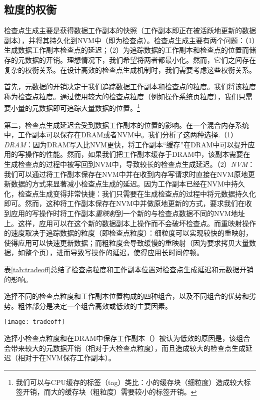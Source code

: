 \subsection{粒度的权衡}\label{subsec:granularity-tradeoff}

检查点生成主要是获得数据工作副本的快照（工作副本即正在被活跃地更新的数据副本），并将其持久化到NVM中（即为检查点）。检查点生成主要有两个问题：（1）生成数据工作副本检查点的延迟；（2）为追踪数据的工作副本和检查点的位置而储存的元数据的开销。理想情况下，我们希望将两者都最小化。然而，它们之间存在复杂的权衡关系。在设计高效的检查点生成机制时，我们需要考虑这些权衡关系。

首先，元数据的开销决定于我们追踪数据工作副本和检查点的粒度。我们将该粒度称为检查点粒度。通过使用较大的检查点粒度（例如操作系统页粒度），我们只需要小量的元数据即可追踪大量数据的位置。\footnote{我们可以与CPU缓存的标签（tag）类比：小的缓存块（细粒度）造成较大标签开销，而大的缓存块（粗粒度）需要较小的标签开销。}

第二，检查点生成延迟会受到数据工作副本的位置的影响。在一个混合内存系统中，工作副本可以保存在DRAM或者NVM中。我们分析了这两种选择.（1）{\em DRAM}：因为DRAM写入比NVM更快，将工作副本“缓存”在DRAM中可以提升应用的写操作的性能。然而，如果我们把工作副本缓存于DRAM中，该副本需要在生成检查点的过程中被写回到NVM中，导致较长的检查点生成延迟。（2）{\em NVM}：我们可以通过将工作副本保存在NVM中并在收到内存写请求时直接在NVM原地更新数据的方式来显著减小检查点生成的延迟。因为工作副本已经在NVM中持久化，检查点生成变得非常快捷：我们只需要在生成检查点的过程中将元数据持久化即可。然而，这种将工作副本保存在NVM中并做原地更新的方式，要求我们在收到应用的写操作时将工作副本\emph{重映射}到一个新的与检查点数据不同的NVM地址上。这样，应用可以在这个新的数据副本上操作而不会破坏检查点。而重映射操作的速度取决于追踪数据的粒度（即检查点粒度）：细粒度可以实现较快的重映射，使得应用可以快速更新数据；而粗粒度会导致缓慢的重映射（因为要求拷贝大量数据，如整个页），进而导致写操作的延迟，使得应用长时间停顿。

表\ref{tab:tradeoff}总结了检查点粒度和工作副本位置对检查点生成延迟和元数据开销的影响。

\begin{table}[!h]
  \centering
  \caption{选择不同的检查点粒度和工作副本位置构成的四种组合，以及不同组合的优势和劣势。粗体部分是决定一个组合高效或低效的主要因素。}
  \texttt{[image: tradeoff]}
  \label{tab:tradeoff}
\end{table}

选择小检查点粒度和在DRAM中保存工作副本（）被认为低效的原因是，该组合会带来较大的元数据开销（相对于大检查点粒度），而且造成较大的检查点生成延迟（相对于在NVM保存工作副本）。

